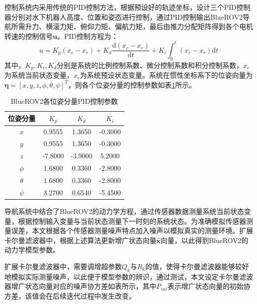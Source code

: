 控制系统内采用传统的PID控制方法，根据预设好的轨迹坐标，设计三个PID控制器分别对水下机器人高度、位置和姿态进行控制，通过PID控制输出BlueROV2导航所需升力、横滚力矩、俯仰力矩、偏航力矩，最后由推力分配矩阵得到各个电机转速的控制信号$\symbf{u}$。PID控制方程为：
\begin{equation}
    u = K_p(x_c-x_r)+K_d\frac{\text{d}(x_c-x_r)}{\text{d}t}+K_i\int_{0}^{t}(x_c-x_r)\text{d}t
\end{equation}
其中，$K_p, K_i, K_d$分别是系统的比例控制系数、微分控制系数和积分控制系数，$x_c$为系统当前状态变量，$x_r$为系统预设状态变量。系统在惯性坐标系下的位姿向量为$\symbf{\eta}=[x,y,z,\phi,\theta,\psi]^T$，则各个位姿分量的控制参数如表\ref{t.PID_params}所示。
\begin{table}[htb]
  \centering
  \caption{BlueROV2各位姿分量PID控制参数}
  \label{t.PID_params}
  \begin{tabular}{cccc}
  \hline
位姿分量 & $K_p$ & $K_d$ & $K_i$ \\
\hline
$x$ & 0.9555 & 1.3650 & -0.3000 \\
$y$ & 0.9555 & 1.3650 & -0.3000 \\
$z$ & -7.8000 & -3.9000 & 5.2000 \\
$\phi$ & 1.6800 & 0.3360 & -2.8000 \\
$\theta$ & 1.6800 & 0.3360 & -2.8000 \\
$\psi$ & 3.2700 & 0.6540 & -5.4500 \\
\hline
\end{tabular}
\end{table}
导航系统中结合了BlueROV2的动力学方程，通过传感器数据测量系统当前状态变量，根据控制输入变量与当前状态测量下一时刻的系统状态。为准确模拟传感器测量误差，本文根据各个传感器测量噪声特点加入噪声以模拟真实的测量环境。扩展卡尔曼滤波器中，根据上述算法更新增广状态向量$\hat{\symbf{x}}$向量，以此得到BlueROV2的动力学模型参数。

扩展卡尔曼滤波器中，需要调增超参数$Q_k$与$R_k$的值，使得卡尔曼滤波器能够较好地模拟实际测量噪声，以此便于模型参数的辨识，通过测试，本文设定卡尔曼滤波器增广状态向量对应的噪声协方差如表所示，其中$P_{ini}$表示增广状态向量的初始协方差，该值会在后续迭代过程中发生改变。

